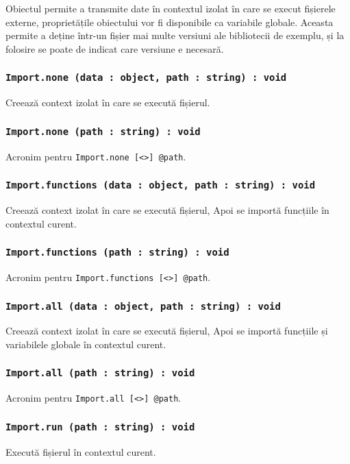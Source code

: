 Obiectul  permite a transmite date în contextul izolat în care se execut fișierele externe, proprietățile obiectului  vor fi disponibile ca variabile globale. Aceasta permite a deține într-un fișier mai multe versiuni ale bibliotecii de exemplu, și la folosire se poate de indicat care versiune e necesară.

\subsubsection{\lstinline|Import.none (data : object, path : string) : void|}

Creează context izolat în care se execută fișierul.

\subsubsection{\lstinline|Import.none (path : string) : void|}

Acronim pentru \lstinline|Import.none [<>] @path|.

\subsubsection{\lstinline|Import.functions (data : object, path : string) : void|}

Creează context izolat în care se execută fișierul, Apoi se importă funcțiile în contextul curent.

\subsubsection{\lstinline|Import.functions (path : string) : void|}

Acronim pentru \lstinline|Import.functions [<>] @path|.

\subsubsection{\lstinline|Import.all (data : object, path : string) : void|}

Creează context izolat în care se execută fișierul, Apoi se importă funcțiile și variabilele globale în contextul curent.

\subsubsection{\lstinline|Import.all (path : string) : void|}

Acronim pentru \lstinline|Import.all [<>] @path|.

\subsubsection{\lstinline|Import.run (path : string) : void|}

Execută fișierul în contextul curent.

